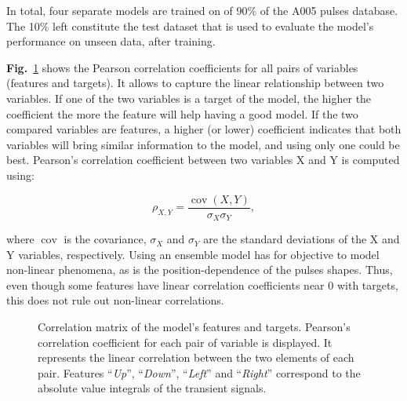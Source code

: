 In total, four separate models are trained on of 90\% of the A005 pulses database. The 10\% left constitute the test dataset that is used to evaluate the model's performance on unseen data, after training.

\textbf{Fig.}~\ref{fig:corr_matrix} shows the Pearson correlation coefficients for all pairs of variables (features and targets). It allows to capture the linear relationship between two variables. If one of the two variables is a target of the model, the higher the coefficient the more the feature will help having a good model. If the two compared variables are features, a higher (or lower) coefficient indicates that both variables will bring similar information to the model, and using only one could be best. Pearson's correlation coefficient between two variables X and Y is computed using:

\begin{equation}
    \rho_{X,Y}={\frac {\operatorname {cov} (X,Y)}{\sigma _{X}\sigma _{Y}}},
\end{equation}

where $\operatorname{cov}$ is the covariance, $\sigma_X$ and $\sigma_Y$ are the standard deviations of the X and Y variables, respectively.
Using an ensemble model has for objective to model non-linear phenomena, as is the position-dependence of the pulses shapes. Thus, even though some features have linear correlation coefficients near 0 with targets, this does not rule out non-linear correlations.

\begin{figure}
\centering
{}
\caption{Correlation matrix of the model's features and targets. Pearson's correlation coefficient for each pair of variable is displayed. It represents the linear correlation between the two elements of each pair. Features ``\textit{Up}'', ``\textit{Down}'', ``\textit{Left}'' and ``\textit{Right}'' correspond to the absolute value integrals of the transient signals.}
\label{fig:corr_matrix}
\end{figure}

